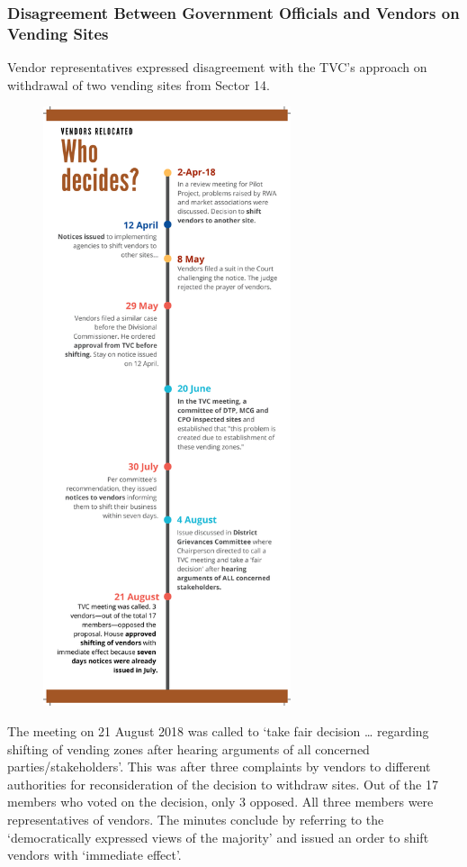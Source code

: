 \documentclass[a4paper, 12pt, twoside]{article}
\begin{document}
{{\subsubsection*{Disagreement Between Government Officials and Vendors on Vending Sites}

Vendor representatives expressed disagreement with the TVC’s approach on withdrawal of two vending sites from Sector 14.

\begin{figure}
\vspace{-10pt}
\hspace{-20pt}
\centering
\includegraphics[height=17.6cm]{WhoDecides.pdf}
\vspace{-40pt}
\end{figure}

The meeting on 21 August 2018 was called to `take fair decision … regarding shifting of vending zones after hearing arguments of all concerned parties/stakeholders'. This was after three complaints by vendors to different authorities for reconsideration of the decision to withdraw sites. Out of the 17 members who voted on the decision, only 3 opposed. All three members were representatives of vendors. The minutes conclude by referring to the `democratically expressed views of the majority' and issued an order to shift vendors with `immediate effect'.

}}
\end{document}
